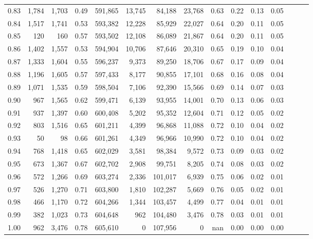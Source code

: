 \begin{tabular}{rrrrrrrrrrrrrrr}
0.83 &   1,784 &  1,703 &  0.49 &  591,865 &   13,745 &   84,188 &   23,768 &  0.63 &  0.22 &  0.13 &      0.05 \\
0.84 &   1,517 &  1,741 &  0.53 &  593,382 &   12,228 &   85,929 &   22,027 &  0.64 &  0.20 &  0.11 &      0.05 \\
0.85 &     120 &    160 &  0.57 &  593,502 &   12,108 &   86,089 &   21,867 &  0.64 &  0.20 &  0.11 &      0.05 \\
0.86 &   1,402 &  1,557 &  0.53 &  594,904 &   10,706 &   87,646 &   20,310 &  0.65 &  0.19 &  0.10 &      0.04 \\
0.87 &   1,333 &  1,604 &  0.55 &  596,237 &    9,373 &   89,250 &   18,706 &  0.67 &  0.17 &  0.09 &      0.04 \\
0.88 &   1,196 &  1,605 &  0.57 &  597,433 &    8,177 &   90,855 &   17,101 &  0.68 &  0.16 &  0.08 &      0.04 \\
0.89 &   1,071 &  1,535 &  0.59 &  598,504 &    7,106 &   92,390 &   15,566 &  0.69 &  0.14 &  0.07 &      0.03 \\
0.90 &     967 &  1,565 &  0.62 &  599,471 &    6,139 &   93,955 &   14,001 &  0.70 &  0.13 &  0.06 &      0.03 \\
0.91 &     937 &  1,397 &  0.60 &  600,408 &    5,202 &   95,352 &   12,604 &  0.71 &  0.12 &  0.05 &      0.02 \\
0.92 &     803 &  1,516 &  0.65 &  601,211 &    4,399 &   96,868 &   11,088 &  0.72 &  0.10 &  0.04 &      0.02 \\
0.93 &      50 &     98 &  0.66 &  601,261 &    4,349 &   96,966 &   10,990 &  0.72 &  0.10 &  0.04 &      0.02 \\
0.94 &     768 &  1,418 &  0.65 &  602,029 &    3,581 &   98,384 &    9,572 &  0.73 &  0.09 &  0.03 &      0.02 \\
0.95 &     673 &  1,367 &  0.67 &  602,702 &    2,908 &   99,751 &    8,205 &  0.74 &  0.08 &  0.03 &      0.02 \\
0.96 &     572 &  1,266 &  0.69 &  603,274 &    2,336 &  101,017 &    6,939 &  0.75 &  0.06 &  0.02 &      0.01 \\
0.97 &     526 &  1,270 &  0.71 &  603,800 &    1,810 &  102,287 &    5,669 &  0.76 &  0.05 &  0.02 &      0.01 \\
0.98 &     466 &  1,170 &  0.72 &  604,266 &    1,344 &  103,457 &    4,499 &  0.77 &  0.04 &  0.01 &      0.01 \\
0.99 &     382 &  1,023 &  0.73 &  604,648 &      962 &  104,480 &    3,476 &  0.78 &  0.03 &  0.01 &      0.01 \\
1.00 &     962 &  3,476 &  0.78 &  605,610 &        0 &  107,956 &        0 &   nan &  0.00 &  0.00 &      0.00 \\
\bottomrule
\end{tabular}

